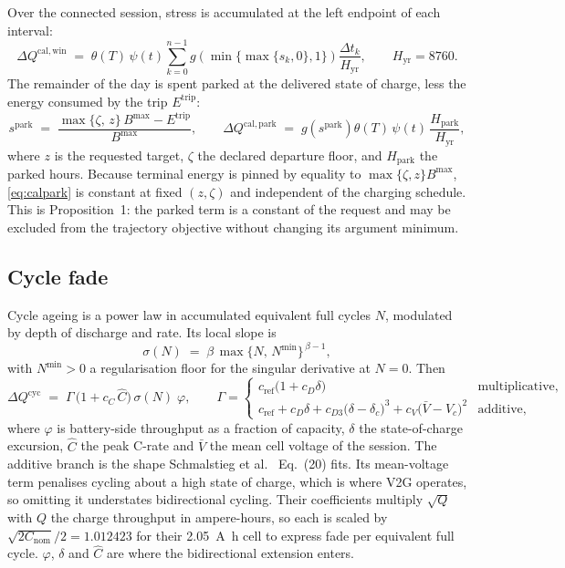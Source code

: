 \documentclass[11pt,a4paper]{article}
\newcommand{\Bmax}{B^{\max}}
\newcommand{\dQ}{\Delta Q}
\begin{document}
Over the connected session, stress is accumulated at the left endpoint
of each interval:
%
\begin{equation}
\dQ^{\mathrm{cal,win}} \;=\; \theta(T)\,\psi(t)
  \sum_{k=0}^{n-1} g\!\left(\min\{\max\{s_k,0\},1\}\right)
  \frac{\Delta t_k}{H_{\mathrm{yr}}},
  \qquad H_{\mathrm{yr}} = \num{8760}.
\label{eq:calwin}
\end{equation}
%
The remainder of the day is spent parked at the delivered state of
charge, less the energy consumed by the trip $E^{\mathrm{trip}}$:
%
\begin{equation}
s^{\mathrm{park}} \;=\;
  \frac{\max\{\zeta,\,z\}\,\Bmax - E^{\mathrm{trip}}}{\Bmax},
\qquad
\dQ^{\mathrm{cal,park}} \;=\; g\!\left(s^{\mathrm{park}}\right)
  \theta(T)\,\psi(t)\,\frac{H_{\mathrm{park}}}{H_{\mathrm{yr}}},
\label{eq:calpark}
\end{equation}
%
where $z$ is the requested target, $\zeta$ the declared departure floor,
and $H_{\mathrm{park}}$ the parked hours. Because terminal energy is
pinned by equality to $\max\{\zeta,z\}\Bmax$,
\eqref{eq:calpark} is constant at fixed $(z,\zeta)$ and independent of
the charging schedule. This is Proposition~1: the parked term is a
constant of the request and may be excluded from the trajectory
objective without changing its argument minimum.

\subsection{Cycle fade}

Cycle ageing is a power law in accumulated equivalent full cycles $N$,
modulated by depth of discharge and rate. Its local slope is
%
\begin{equation}
\sigma(N) \;=\; \beta \,\max\{N,\,N^{\min}\}^{\,\beta-1},
\label{eq:cycslope}
\end{equation}
%
with $N^{\min}>0$ a regularisation floor for the singular derivative at
$N=0$. Then
%
\begin{equation}
\dQ^{\mathrm{cyc}} \;=\; \Gamma \,
  \bigl(1 + c_C\,\hat{C}\bigr)\,
  \sigma(N)\;\varphi ,
\qquad
\Gamma =
\begin{cases}
c_{\mathrm{ref}}\bigl(1 + c_D \delta\bigr) & \text{multiplicative,}\\[2pt]
c_{\mathrm{ref}} + c_D \delta + c_{D3}\bigl(\delta - \delta_c\bigr)^{3}
  + c_V\bigl(\bar{V} - V_c\bigr)^{2} & \text{additive,}
\end{cases}
\label{eq:cyc}
\end{equation}
%
where $\varphi$ is battery-side throughput as a fraction of capacity,
$\delta$ the state-of-charge excursion, $\hat{C}$ the peak C-rate and
$\bar{V}$ the mean cell voltage of the session. The additive branch is
the shape Schmalstieg et al.~\cite{schmalstieg2014} Eq.~(20) fits. Its
mean-voltage term penalises cycling about a high state of charge, which
is where V2G operates, so omitting it understates bidirectional
cycling. Their coefficients multiply $\sqrt{Q}$ with $Q$ the charge
throughput in ampere-hours, so each is scaled by
$\sqrt{2C_{\mathrm{nom}}}/2 = \num{1.012423}$ for their
\SI{2.05}{\ampere\hour} cell to express fade per equivalent full cycle.
$\varphi$, $\delta$ and $\hat{C}$ are where the bidirectional extension
enters.
\end{document}
